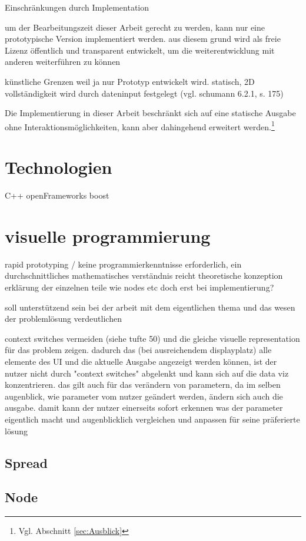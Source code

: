 \documentclass[a4paper, 12pt, DIVcalc, onepage, pdftex, headsepline, footsepline]{scrreprt}
\begin{document}
Einschränkungen durch Implementation

um der Bearbeitungszeit dieser Arbeit gerecht zu werden, kann nur eine prototypische Version implementiert werden.
aus diesem grund wird als freie Lizenz  öffentlich und transparent entwickelt, um die weiterentwicklung mit anderen weiterführen zu können


künstliche Grenzen weil ja nur Prototyp entwickelt wird.
statisch, 2D vollständigkeit wird durch dateninput festgelegt (vgl. schumann 6.2.1, s. 175)

Die Implementierung in dieser Arbeit beschränkt sich auf eine statische Ausgabe ohne Interaktionsmöglichkeiten,
kann aber dahingehend erweitert werden.\footnote{Vgl. Abschnitt \ref{sec:Ausblick}}

\section{Technologien}
\label{sec:Technologien}
C++
openFrameworks
boost
\section{visuelle programmierung}
\label{sec:visPro}
rapid prototyping / keine programmierkenntnisse erforderlich, ein durchschnittliches mathematisches verständnis reicht
theoretische konzeption
erklärung der einzelnen teile wie nodes etc doch erst bei implementierung?

soll unterstützend sein bei der arbeit mit dem eigentlichen thema und das wesen der problemlösung verdeutlichen

context switches vermeiden (siehe tufte 50) und die gleiche visuelle representation für das problem zeigen.
dadurch das (bei ausreichendem displayplatz) alle elemente des UI und die aktuelle Ausgabe angezeigt werden können, ist der nutzer nicht durch "context switches" abgelenkt und kann sich auf die data viz konzentrieren.
das gilt auch für das verändern von parametern, da im selben augenblick, wie parameter vom nutzer geändert werden, ändern sich auch die ausgabe.
damit kann der nutzer einerseits sofort erkennen was der parameter eigentlich macht und augenblicklich vergleichen und anpassen für seine präferierte lösung
\subsection{Spread}
\subsection{Node}
\end{document}
